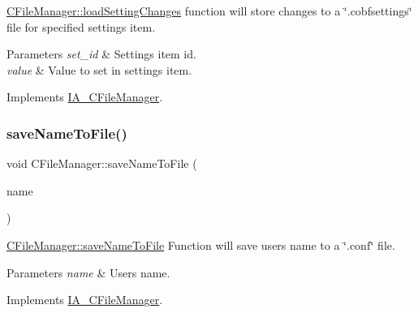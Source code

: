 \hyperlink{classCFileManager_a59a238f3027f33473cfa1c2fe977521e}{C\+File\+Manager\+::load\+Setting\+Changes} function will store changes to a \char`\"{}.\+cobfsettings\char`\"{} file for specified setting\textquotesingle{}s item. 


\begin{DoxyParams}{Parameters}
{\em set\+\_\+id} & Setting\textquotesingle{}s item id. \\
\hline
{\em value} & Value to set in setting\textquotesingle{}s item. \\
\hline
\end{DoxyParams}


Implements \hyperlink{classIA__CFileManager}{I\+A\+\_\+\+C\+File\+Manager}.

\mbox{\label{classCFileManager_a4722bc73ddd3e128774856beea01c61e}} 
\subsubsection{\texorpdfstring{save\+Name\+To\+File()}{saveNameToFile()}}
{\footnotesize\ttfamily void C\+File\+Manager\+::save\+Name\+To\+File (\begin{DoxyParamCaption}\item[{Q\+Byte\+Array}]{name }\end{DoxyParamCaption})\hspace{0.3cm}{\ttfamily [virtual]}}



\hyperlink{classCFileManager_a4722bc73ddd3e128774856beea01c61e}{C\+File\+Manager\+::save\+Name\+To\+File} Function will save user\textquotesingle{}s name to a \char`\"{}.\+conf\char`\"{} file. 


\begin{DoxyParams}{Parameters}
{\em name} & User\textquotesingle{}s name. \\
\hline
\end{DoxyParams}


Implements \hyperlink{classIA__CFileManager}{I\+A\+\_\+\+C\+File\+Manager}.

\mbox{\label{classCFileManager_ab509134180d95af83a5ad7bd51f8f9ed}} 
